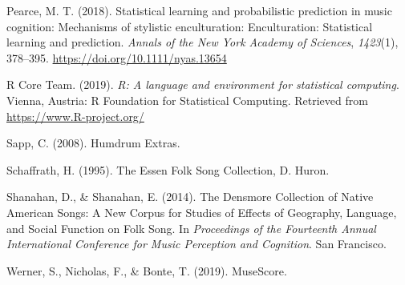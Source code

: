\documentclass[english,man]{apa6}
\begin{document}
\leavevmode\hypertarget{ref-pearceStatisticalLearningProbabilistic2018a}{}%
Pearce, M. T. (2018). Statistical learning and probabilistic prediction in music cognition: Mechanisms of stylistic enculturation: Enculturation: Statistical learning and prediction. \emph{Annals of the New York Academy of Sciences}, \emph{1423}(1), 378--395. \url{https://doi.org/10.1111/nyas.13654}

\leavevmode\hypertarget{ref-R-base}{}%
R Core Team. (2019). \emph{R: A language and environment for statistical computing}. Vienna, Austria: R Foundation for Statistical Computing. Retrieved from \url{https://www.R-project.org/}

\leavevmode\hypertarget{ref-sappHumdrumExtras2008}{}%
Sapp, C. (2008). Humdrum Extras.

\leavevmode\hypertarget{ref-schaffrathEssenFolkSong1995}{}%
Schaffrath, H. (1995). The Essen Folk Song Collection, D. Huron.

\leavevmode\hypertarget{ref-shanahanDensmoreCollectionNative2014}{}%
Shanahan, D., \& Shanahan, E. (2014). The Densmore Collection of Native American Songs: A New Corpus for Studies of Effects of Geography, Language, and Social Function on Folk Song. In \emph{Proceedings of the Fourteenth Annual International Conference for Music Perception and Cognition}. San Francisco.

\leavevmode\hypertarget{ref-wernerMuseScore2019}{}%
Werner, S., Nicholas, F., \& Bonte, T. (2019). MuseScore.

\endgroup
\end{document}
